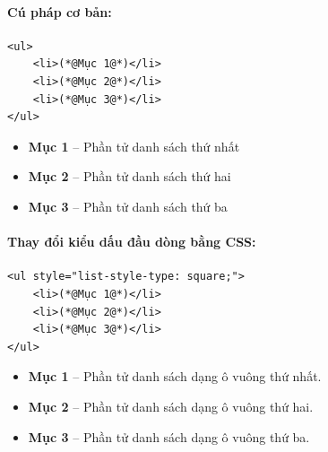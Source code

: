 \paragraph{Cú pháp cơ bản:}
\begin{codeWindow}
\begin{lstlisting}[language=HTML5]
<ul>
    <li>(*@Mục 1@*)</li>
    <li>(*@Mục 2@*)</li>
    <li>(*@Mục 3@*)</li>
</ul>
\end{lstlisting}
\end{codeWindow}

\begin{browserWindow}
\begin{itemize}[leftmargin=1.5em, itemsep=3pt, parsep=0pt]
    \item \textbf{Mục 1} -- Phần tử danh sách thứ nhất
    \item \textbf{Mục 2} -- Phần tử danh sách thứ hai
    \item \textbf{Mục 3} -- Phần tử danh sách thứ ba
\end{itemize}
\end{browserWindow}

\paragraph{Thay đổi kiểu dấu đầu dòng bằng CSS:}
\begin{codeWindow}
\begin{lstlisting}[language=HTML5]
<ul style="list-style-type: square;">
    <li>(*@Mục 1@*)</li>
    <li>(*@Mục 2@*)</li>
    <li>(*@Mục 3@*)</li>
</ul>
\end{lstlisting}
\end{codeWindow}

\begin{browserWindow}
\begin{itemize}[label=\textcolor{primaryBlue}{\rule{0.7ex}{0.7ex}}, leftmargin=1.5em, itemsep=3pt, parsep=0pt]
    \item \textbf{Mục 1} -- Phần tử danh sách dạng ô vuông thứ nhất.
    \item \textbf{Mục 2} -- Phần tử danh sách dạng ô vuông thứ hai.
    \item \textbf{Mục 3} -- Phần tử danh sách dạng ô vuông thứ ba.
\end{itemize}
\end{browserWindow}

